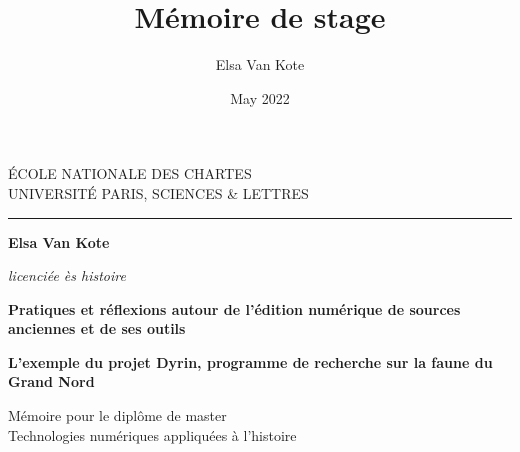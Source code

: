 \documentclass[a4paper,12pt,twoside]{book}
\title{Mémoire de stage}
\author{Elsa Van Kote}
\date{May 2022}
\begin{document}
\begin{titlepage}
		\begin{center}
			
			\bigskip
			
			\begin{large}				
				ÉCOLE NATIONALE DES CHARTES\\
				UNIVERSITÉ PARIS, SCIENCES \& LETTRES
			\end{large}
			\begin{center}\rule{2cm}{0.02cm}\end{center}
			
			\bigskip
			\bigskip
			\bigskip
			\begin{Large}
				\textbf{Elsa Van Kote}\\
			\end{Large}
			\begin{normalsize} \textit{licenciée ès histoire}\\
			\end{normalsize}
			
			\bigskip
			\bigskip
			\bigskip
			
			\begin{Huge}
				\textbf{Pratiques et réflexions autour de l'édition numérique de sources anciennes et de ses outils}\\
			\end{Huge}
			\bigskip
			\bigskip
			\begin{LARGE}
				\textbf{L'exemple du projet Dyrin, programme de recherche sur la faune du Grand Nord}\\
			\end{LARGE}
			
			\bigskip
			\bigskip
			\bigskip
			\begin{large}
			\end{large}
			\vfill
			
			\begin{large}
				Mémoire 
				pour le diplôme de master \\
				\og{} Technologies numériques appliquées à l'histoire \fg{} \\
			\end{large}
			
		\end{center}
	\end{titlepage}

	\thispagestyle{empty}	
	\cleardoublepage
	
	\frontmatter
\end{document}
